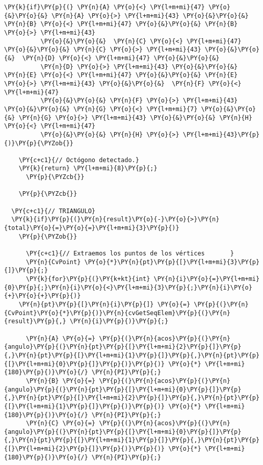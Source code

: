 \begin{Verbatim}[commandchars=\\\{\}]
      \PY{k}{if}\PY{p}{(} \PY{n}{A} \PY{o}{<} \PY{l+m+mi}{47} \PY{o}{&}\PY{o}{&} \PY{n}{A} \PY{o}{>} \PY{l+m+mi}{43} \PY{o}{&}\PY{o}{&} \PY{n}{B} \PY{o}{<} \PY{l+m+mi}{47} \PY{o}{&}\PY{o}{&} \PY{n}{B} \PY{o}{>} \PY{l+m+mi}{43}
          \PY{o}{&}\PY{o}{&}  \PY{n}{C} \PY{o}{<} \PY{l+m+mi}{47} \PY{o}{&}\PY{o}{&} \PY{n}{C} \PY{o}{>} \PY{l+m+mi}{43} \PY{o}{&}\PY{o}{&}  \PY{n}{D} \PY{o}{<} \PY{l+m+mi}{47} \PY{o}{&}\PY{o}{&}
          \PY{n}{D} \PY{o}{>} \PY{l+m+mi}{43} \PY{o}{&}\PY{o}{&} \PY{n}{E} \PY{o}{<} \PY{l+m+mi}{47} \PY{o}{&}\PY{o}{&} \PY{n}{E} \PY{o}{>} \PY{l+m+mi}{43} \PY{o}{&}\PY{o}{&}  \PY{n}{F} \PY{o}{<} \PY{l+m+mi}{47}
          \PY{o}{&}\PY{o}{&} \PY{n}{F} \PY{o}{>} \PY{l+m+mi}{43} \PY{o}{&}\PY{o}{&} \PY{n}{G} \PY{o}{<} \PY{l+m+mi}{7} \PY{o}{&}\PY{o}{&} \PY{n}{G} \PY{o}{>} \PY{l+m+mi}{43} \PY{o}{&}\PY{o}{&} \PY{n}{H} \PY{o}{<} \PY{l+m+mi}{47}
          \PY{o}{&}\PY{o}{&} \PY{n}{H} \PY{o}{>} \PY{l+m+mi}{43}\PY{p}{)}\PY{p}{\PYZob{}} 

	\PY{c+c1}{// Octógono detectado.}
	\PY{k}{return} \PY{l+m+mi}{8}\PY{p}{;}
      \PY{p}{\PYZcb{}}
	   
    \PY{p}{\PYZcb{}} 
         
  \PY{c+c1}{// TRIANGULO}
  \PY{k}{if}\PY{p}{(}\PY{n}{result}\PY{o}{-}\PY{o}{>}\PY{n}{total}\PY{o}{=}\PY{o}{=}\PY{l+m+mi}{3}\PY{p}{)} 
    \PY{p}{\PYZob{}}

      \PY{c+c1}{// Extraemos los puntos de los vértices		  }
      \PY{n}{CvPoint} \PY{o}{*}\PY{n}{pt}\PY{p}{[}\PY{l+m+mi}{3}\PY{p}{]}\PY{p}{;}
      \PY{k}{for}\PY{p}{(}\PY{k+kt}{int} \PY{n}{i}\PY{o}{=}\PY{l+m+mi}{0}\PY{p}{;}\PY{n}{i}\PY{o}{<}\PY{l+m+mi}{3}\PY{p}{;}\PY{n}{i}\PY{o}{+}\PY{o}{+}\PY{p}{)}
	\PY{n}{pt}\PY{p}{[}\PY{n}{i}\PY{p}{]} \PY{o}{=} \PY{p}{(}\PY{n}{CvPoint}\PY{o}{*}\PY{p}{)}\PY{n}{cvGetSeqElem}\PY{p}{(}\PY{n}{result}\PY{p}{,} \PY{n}{i}\PY{p}{)}\PY{p}{;}

      \PY{n}{A} \PY{o}{=} \PY{p}{(}\PY{n}{acos}\PY{p}{(}\PY{n}{angulo}\PY{p}{(}\PY{n}{pt}\PY{p}{[}\PY{l+m+mi}{2}\PY{p}{]}\PY{p}{,}\PY{n}{pt}\PY{p}{[}\PY{l+m+mi}{1}\PY{p}{]}\PY{p}{,}\PY{n}{pt}\PY{p}{[}\PY{l+m+mi}{0}\PY{p}{]}\PY{p}{)}\PY{p}{)} \PY{o}{*} \PY{l+m+mi}{180}\PY{p}{)}\PY{o}{/} \PY{n}{PI}\PY{p}{;}
      \PY{n}{B} \PY{o}{=} \PY{p}{(}\PY{n}{acos}\PY{p}{(}\PY{n}{angulo}\PY{p}{(}\PY{n}{pt}\PY{p}{[}\PY{l+m+mi}{0}\PY{p}{]}\PY{p}{,}\PY{n}{pt}\PY{p}{[}\PY{l+m+mi}{2}\PY{p}{]}\PY{p}{,}\PY{n}{pt}\PY{p}{[}\PY{l+m+mi}{1}\PY{p}{]}\PY{p}{)}\PY{p}{)} \PY{o}{*} \PY{l+m+mi}{180}\PY{p}{)}\PY{o}{/} \PY{n}{PI}\PY{p}{;}
      \PY{n}{C} \PY{o}{=} \PY{p}{(}\PY{n}{acos}\PY{p}{(}\PY{n}{angulo}\PY{p}{(}\PY{n}{pt}\PY{p}{[}\PY{l+m+mi}{0}\PY{p}{]}\PY{p}{,}\PY{n}{pt}\PY{p}{[}\PY{l+m+mi}{1}\PY{p}{]}\PY{p}{,}\PY{n}{pt}\PY{p}{[}\PY{l+m+mi}{2}\PY{p}{]}\PY{p}{)}\PY{p}{)} \PY{o}{*} \PY{l+m+mi}{180}\PY{p}{)}\PY{o}{/} \PY{n}{PI}\PY{p}{;} 


\end{Verbatim}
